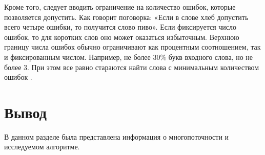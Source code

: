 Кроме того, следует вводить ограничение на количество ошибок, которые позволяется допустить. Как говорит поговорка: «Если в слове хлеб допустить всего четыре ошибки, то получится слово пиво». 
Если фиксируется число ошибок, то для коротких слов оно может оказаться избыточным.
Верхнюю границу числа ошибок обычно ограничивают как процентным соотношением, так и фиксированным числом. 
Например, не более $30\%$ букв входного слова, но не более 3.
При этом все равно стараются найти слова с минимальным количеством ошибок \cite{miem}.

\section*{Вывод} 
В данном разделе была представлена информация о многопоточности
и исследуемом алгоритме.